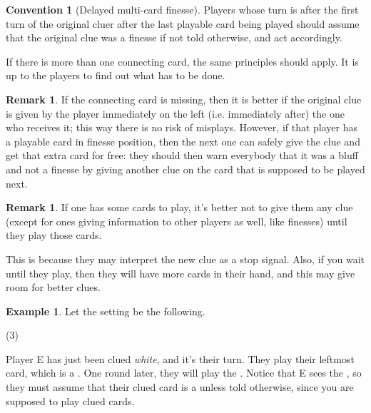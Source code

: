 \documentclass[a4paper]{article}
\theoremstyle{plain}
\theoremstyle{definition}
\newtheorem{remark}[theorem]{Remark}
\newtheorem{example}[theorem]{Example}
\newtheorem{convention}[theorem]{Convention}
\begin{document}
\begin{convention}[Delayed multi-card finesse]
	Players whose turn is after the first turn of the original cluer after the last playable card being played should assume that the original clue was a finesse if not told otherwise, and act accordingly.
	
	If there is more than one connecting card, the same principles should apply. It is up to the players to find out what has to be done.
\end{convention}

\begin{remark}
	If the connecting card is missing, then it is better if the original clue is given by the player immediately on the left (i.e. immediately after) the one who receives it; this way there is no risk of misplays. However, if that player has a playable card in finesse position, then the next one can safely give the clue and get that extra card for free: they should then warn everybody that it was a bluff and not a finesse by giving another clue on the card that is supposed to be played next.
\end{remark}


\begin{remark}
	If one has some cards to play, it's better not to give them any clue (except for ones giving information to other players as well, like finesses) until they play those cards.
\end{remark}

This is because they may interpret the new clue as a stop signal. Also, if you wait until they play, then they will have more cards in their hand, and this may give room for better clues.

\begin{example}
	
	Let the setting be the following.
	
	\begin{tasks}(3)
		\task[+]      
		\task[A]    
		\task[B]    
		\task[C]    
		\task[D]    
		\task[E]    
	\end{tasks}

	Player E has just been clued \textit{white}, and it's their turn. They play their leftmost card, which is a . One round later, they will play the . Notice that E sees the , so they must assume that their clued card is a  unless told otherwise, since you are supposed to play clued cards.

\end{example}
\end{document}
